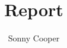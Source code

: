 \documentclass{article}
\title{Report}
\author{Sonny Cooper}
\begin{document}
\twocolumn
\maketitle

\end{document}

